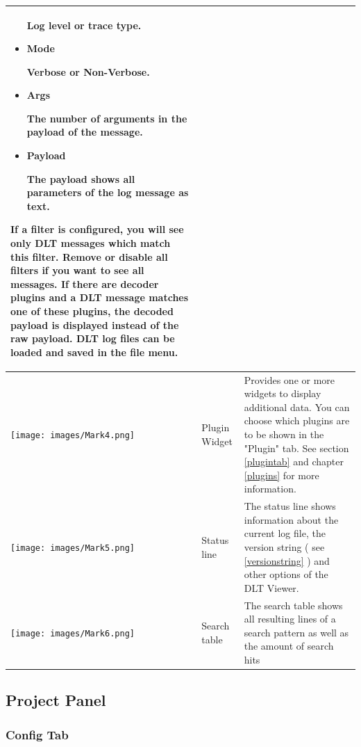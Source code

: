 \documentclass[a4paper,11pt]{article}
\begin{document}
\begin{longtable}{| l | m{3cm}  | m{11cm} |}
\begin{itemize}
    Log level or trace type.
   \item \begin{bf}Mode\end{bf}
    Verbose or Non-Verbose.
   \item \begin{bf}Args\end{bf}
    The number of arguments in the payload of the message.
   \item \begin{bf}Payload\end{bf}
    The payload shows all parameters of the log message as text.
  \end{itemize}
If a filter is configured, you will see only DLT messages which match
this filter. Remove or disable all filters if you want to see all messages.
If there are decoder plugins and a DLT message matches one of these plugins, the decoded
payload is displayed instead of the raw payload.
DLT log files can be loaded and saved in the file menu.
 \\
   \hline
   \texttt{[image: images/Mark4.png]}
   & Plugin Widget
   & Provides one or more widgets to display additional data. You can choose which plugins are to be shown in the "Plugin" tab.
   See section \autoref{plugintab} and chapter \autoref{plugins} for more information.   \\
   \hline
   \texttt{[image: images/Mark5.png]}
   & Status line
   & \label{footer}The status line shows information about the current log file,
     the version string ( see \autoref{versionstring} ) and other options of the DLT Viewer. \\
   \hline
   \texttt{[image: images/Mark6.png]}
    & Search table
    & \label{searchtable}The search table shows all resulting lines of a search pattern as well as the amount of search hits \\
   \hline

\end{longtable}


\pagebreak

\subsection{Project Panel}

\subsubsection{Config Tab}
\end{document}
